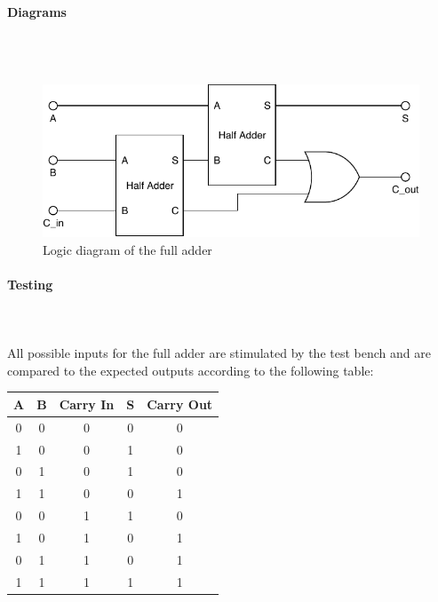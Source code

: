 \documentclass{article}
\begin{document}
    \paragraph{Diagrams}
    \hfill\\\\
    \begin{figure}[H]
        \centering
        \includegraphics{../diagrams/alu/adder/full_adder.pdf}
        \caption{Logic diagram of the full adder}
    \end{figure}

    \paragraph{Testing}
    \hfill\\\\
    All possible inputs for the full adder are stimulated by the test bench
    and are compared to the expected outputs according to the following
    table:

    \begin{center}
        \begin{tabular}{|c|c|c||c|c|}
            \hline
            A & B & Carry In & S & Carry Out
            \\\hline\hline
            0 & 0 & 0 & 0 & 0
            \\\hline
            1 & 0 & 0 & 1 & 0
            \\\hline
            0 & 1 & 0 & 1 & 0
            \\\hline
            1 & 1 & 0 & 0 & 1
            \\\hline
            0 & 0 & 1 & 1 & 0
            \\\hline
            1 & 0 & 1 & 0 & 1
            \\\hline
            0 & 1 & 1 & 0 & 1
            \\\hline
            1 & 1 & 1 & 1 & 1
            \\\hline
        \end{tabular}
    \end{center}
\end{document}
